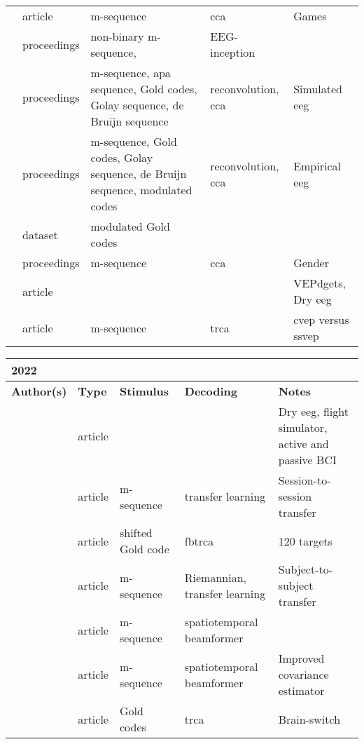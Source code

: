 \documentclass[a4paper,landscape]{article}
\begin{document}
\begin{table}[H]
\begin{tabular}{p{5cm}p{2cm}p{5cm}p{5cm}p{6.5cm}}
		\citeauthor{moreno2023} & article & m-sequence & \acrshort{cca} & Games \\
		\citeauthor{santamaria2023} & proceedings & non-binary m-sequence, & EEG-inception & \\
		\citeauthor{thielen2023a} & proceedings & m-sequence, \acrshort{apa} sequence, Gold codes, Golay sequence, de Bruijn sequence & reconvolution, \acrshort{cca} & Simulated \acrshort{eeg} \\
		\citeauthor{thielen2023b} & proceedings & m-sequence, Gold codes, Golay sequence, de Bruijn sequence, modulated codes & reconvolution, \acrshort{cca} & Empirical \acrshort{eeg} \\
		\citeauthor{thielen2023dataset} & dataset & modulated Gold codes & & \\
		\citeauthor{volosyak2023} & proceedings & m-sequence & \acrshort{cca} & Gender \\
		\citeauthor{wolf2023} & article & & & VEPdgets, Dry \acrshort{eeg} \\
		\citeauthor{xu2023} & article & m-sequence & \acrshort{trca} & \acrshort{cvep} versus \acrshort{ssvep} \\
		\bottomrule
	\end{tabular}
\end{table}	

\begin{table}[H]
	\begin{tabular}{p{5cm}p{2cm}p{5cm}p{5cm}p{6.5cm}}
		\textbf{2022} & & & & \\
		\toprule
		\textbf{Author(s)} & \textbf{Type} & \textbf{Stimulus} & \textbf{Decoding} & \textbf{Notes} \\
		\midrule
		\citeauthor{dehais2022} & article & & & Dry \acrshort{eeg}, flight simulator, active and passive BCI \\
		\citeauthor{stawicki2022} & article & m-sequence & transfer learning & Session-to-session transfer \\
		\citeauthor{sun2022} & article & shifted Gold code & \acrshort{fbtrca} & 120 targets \\
		\citeauthor{ying2022} & article & m-sequence & Riemannian, transfer learning & Subject-to-subject transfer \\
		\citeauthor{zarei2022a} & article & m-sequence & spatiotemporal beamformer & \\
		\citeauthor{zarei2022b} & article & m-sequence & spatiotemporal beamformer & Improved covariance estimator \\
		\citeauthor{zheng2022} & article & Gold codes & \acrshort{trca} & Brain-switch \\
		\bottomrule
	\end{tabular}
\end{table}
\end{document}
